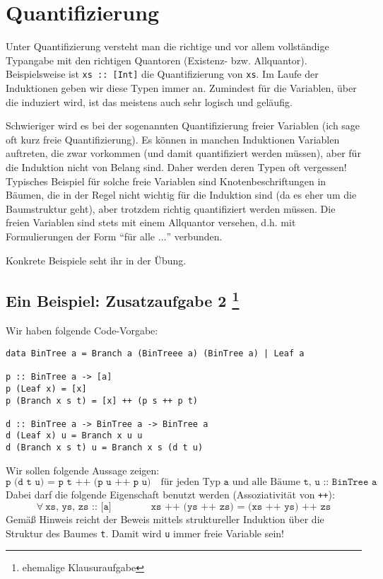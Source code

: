 \documentclass[ngerman, a4paper, 11pt]{article}
\theoremstyle{nonumberplain}
\begin{document}
\section*{Quantifizierung}

Unter Quantifizierung versteht man die richtige und vor allem vollständige Typangabe mit den richtigen Quantoren (Existenz- bzw. Allquantor). Beispielsweise ist \texttt{xs :: [Int]} die Quantifizierung von \texttt{xs}. Im Laufe der Induktionen geben wir diese Typen immer an. Zumindest für die Variablen, über die induziert wird, ist das meistens auch sehr logisch und geläufig. 

Schwieriger wird es bei der sogenannten Quantifizierung freier Variablen (ich sage oft kurz freie Quantifizierung). Es können in manchen Induktionen Variablen auftreten, die zwar vorkommen (und damit quantifiziert werden müssen), aber für die Induktion nicht von Belang sind. Daher werden deren Typen oft vergessen! Typisches Beispiel für solche freie Variablen sind Knotenbeschriftungen in Bäumen, die in der Regel nicht wichtig für die Induktion sind (da es eher um die Baumstruktur geht), aber trotzdem richtig quantifiziert werden müssen. Die freien Variablen sind stets mit einem Allquantor versehen, d.h. mit Formulierungen der Form \enquote{für alle $\dots$} verbunden.

Konkrete Beispiele seht ihr in der Übung.

\subsection*{Ein Beispiel: Zusatzaufgabe {2 }\footnote{ehemalige Klausuraufgabe}}

Wir haben folgende Code-Vorgabe:

\begin{lstlisting}[style=frame]
data BinTree a = Branch a (BinTreee a) (BinTree a) | Leaf a

p :: BinTree a -> [a]
p (Leaf x) = [x]
p (Branch x s t) = [x] ++ (p s ++ p t)

d :: BinTree a -> BinTree a -> BinTree a
d (Leaf x) u = Branch x u u
d (Branch x s t) u = Branch x s (d t u)
\end{lstlisting}

Wir sollen folgende Aussage zeigen:
\begin{equation*}
	\texttt{p (d t u) = p t ++ (p u ++ p u)} \quad \text{für jeden Typ } \texttt{a} \text{ und alle Bäume } \texttt{t, u :: BinTree a}
\end{equation*}
Dabei darf die folgende Eigenschaft benutzt werden (Assoziativität von \texttt{++}):
\begin{equation}
	\forall \ \texttt{xs, ys, zs :: [a]} \qquad\qquad \texttt{xs ++ (ys ++ zs) = (xs ++ ys) ++ zs}
	\tag{B}
\end{equation}
Gemäß Hinweis reicht der Beweis mittels struktureller Induktion über die Struktur des Baumes \texttt{t}. Damit wird \texttt{u} immer freie Variable sein!
\end{document}
